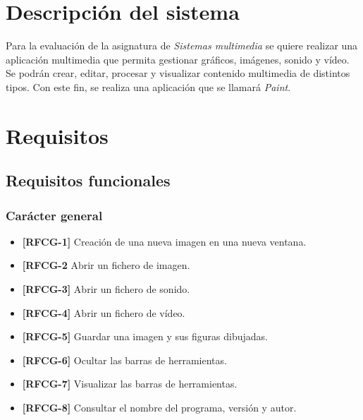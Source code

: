 \pagestyle{empty}
\maketitle
\vskip1cm
\clearpage
\tableofcontents
\clearpage
\setcounter{page}{1}
\pagestyle{plain}
\section{Descripción del sistema}
Para la evaluación de la asignatura de \textit{Sistemas multimedia} se quiere realizar una aplicación multimedia que permita gestionar gráficos, imágenes, sonido y vídeo. Se podrán crear, editar, procesar y visualizar contenido multimedia de distintos tipos.
\vskip0.3cm
Con este fin, se realiza una aplicación que se llamará \textit{Paint}.
\section{Requisitos}
\subsection{Requisitos funcionales}
\subsubsection{Carácter general}
\begin{itemize}
\item{\textbf{[RFCG-1]} Creación de una nueva imagen en una nueva ventana.}
\item{\textbf{[RFCG-2} Abrir un fichero de imagen.}
\item{\textbf{[RFCG-3]} Abrir un fichero de sonido.}
\item{\textbf{[RFCG-4]} Abrir un fichero de vídeo.}
\item{\textbf{[RFCG-5]} Guardar una imagen y sus figuras dibujadas.}
\item{\textbf{[RFCG-6]} Ocultar las barras de herramientas.}
\item{\textbf{[RFCG-7]} Visualizar las barras de herramientas.}
\item{\textbf{[RFCG-8]} Consultar el nombre del programa, versión y autor.}
\end{itemize}
